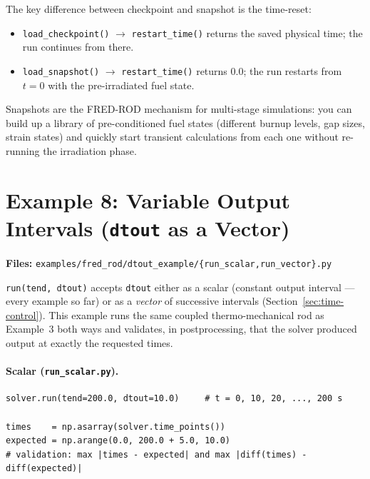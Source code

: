 \documentclass[11pt,a4paper]{article}
\begin{document}
The key difference between checkpoint and snapshot is the time-reset:
\begin{itemize}
  \item \texttt{load\_checkpoint()} $\to$ \texttt{restart\_time()} returns
        the saved physical time; the run continues from there.
  \item \texttt{load\_snapshot()} $\to$ \texttt{restart\_time()} returns
        $0.0$; the run restarts from $t=0$ with the pre-irradiated fuel state.
\end{itemize}

\begin{infobox}
  Snapshots are the FRED-ROD mechanism for multi-stage simulations: you can
  build up a library of pre-conditioned fuel states (different burnup levels,
  gap sizes, strain states) and quickly start transient calculations from
  each one without re-running the irradiation phase.
\end{infobox}

\section{Example 8: Variable Output Intervals (\texttt{dtout} as a Vector)}
\label{sec:dtout}

\textbf{Files:} \texttt{examples/fred\_rod/dtout\_example/\{run\_scalar,run\_vector\}.py}

\medskip
\texttt{run(tend, dtout)} accepts \texttt{dtout} either as a scalar
(constant output interval --- every example so far) or as a \emph{vector} of
successive intervals (Section~\ref{sec:time-control}).  This example runs
the same coupled thermo-mechanical rod as Example~3 both ways and validates,
in postprocessing, that the solver produced output at exactly the requested
times.

\paragraph{Scalar (\texttt{run\_scalar.py}).}

\begin{lstlisting}
solver.run(tend=200.0, dtout=10.0)     # t = 0, 10, 20, ..., 200 s

times    = np.asarray(solver.time_points())
expected = np.arange(0.0, 200.0 + 5.0, 10.0)
# validation: max |times - expected| and max |diff(times) - diff(expected)|
\end{lstlisting}
\end{document}
